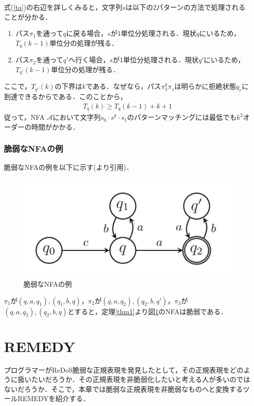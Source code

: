 \documentclass[a4paper, 12pt, dvipdfmx, uplatex]{jsreport}
\begin{document}
式(\ref{tq})の右辺を詳しくみると，文字列$s$は以下の2パターンの方法で処理されることが分かる．
\begin{enumerate}
  \item パス$\pi_1$を通って$q$に戻る場合，$s$が1単位分処理される．現状$q$にいるため，$T_q(k-1)$単位分の処理が残る．
  \item パス$\pi_2$を通って$q'$へ行く場合，$s$が1単位分処理される．現状$q'$にいるため，$T_{q'}(k-1)$単位分の処理が残る．
\end{enumerate}

ここで，$T_{q'}(k)$の下界は$k$である．なぜなら，パス$\pi_3^k \pi_s$は明らかに拒絶状態$q_r$に到達できるからである．このことから，
\begin{align*}
  T_q(k)\geq T_q(k-1)+k+1
\end{align*}
従って，NFA $\mathcal{A}$において文字列$s_0\cdot s^k\cdot s_1$のパターンマッチングには最低でも$k^2$オーダーの時間がかかる．

\subsubsection{脆弱なNFAの例}\label{ex}
脆弱なNFAの例を以下に示す(\cite{vul_detect}より引用)．
\begin{figure}[H] %
  \centering
  \includegraphics[width=0.75\linewidth]{../figures/vul_ex.jpg}
  \caption{脆弱なNFAの例\label{vul_ex}}
\end{figure}

$\pi_1$が$(q,a,q_1),(q_1,b,q)$，$\pi_2$が$(q,a,q_2),(q_2,b,q')$，$\pi_3$が$(q,a,q_2),(q_2,b,q)$とすると，定理\ref{thm1}より図\ref{vul_ex}のNFAは脆弱である．




\section{REMEDY}\label{sec_remedy}
プログラマーがReDoS脆弱な正規表現を発見したとして，その正規表現をどのように扱いたいだろうか．その正規表現を非脆弱化したいと考える人が多いのではないだろうか．そこで，本章では脆弱な正規表現を非脆弱なものへと変換するツールREMEDY\cite{remedy}を紹介する．
\end{document}
